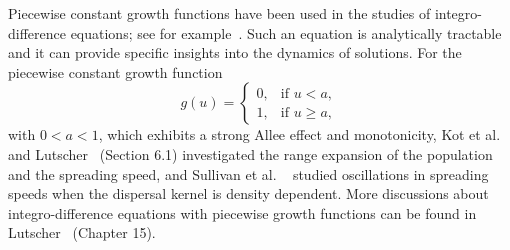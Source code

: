 \documentclass[11pt]{article}
\theoremstyle{definition}
\numberwithin{equation}{section}
\numberwithin{thm}{section}
\renewcommand{\a}{a}
\begin{document}
Piecewise constant growth functions have been used in the studies of integro-difference equations; see for example~\cite{kot1, lut, otto,  pnas}. Such an equation 
is analytically tractable and it can provide specific insights into the dynamics of solutions.  For the piecewise constant growth function
\begin{equation} \label{g0}
g(u) = \begin{cases}
0, & \text{if } u < \a, \\
1, & \text{if } u \geq \a,
\end{cases}
\end{equation}
with $0<a<1$,  which exhibits a strong Allee effect and monotonicity,  Kot et al.~\cite{kot1} and Lutscher~\cite{lut} (Section 6.1) investigated the range expansion of the population and the spreading speed, and Sullivan et al. ~\cite{pnas} studied oscillations in spreading speeds when the dispersal kernel is density dependent. 
More discussions about integro-difference equations with piecewise growth functions can be found in Lutscher~\cite{lut} (Chapter 15). 
\end{document}
